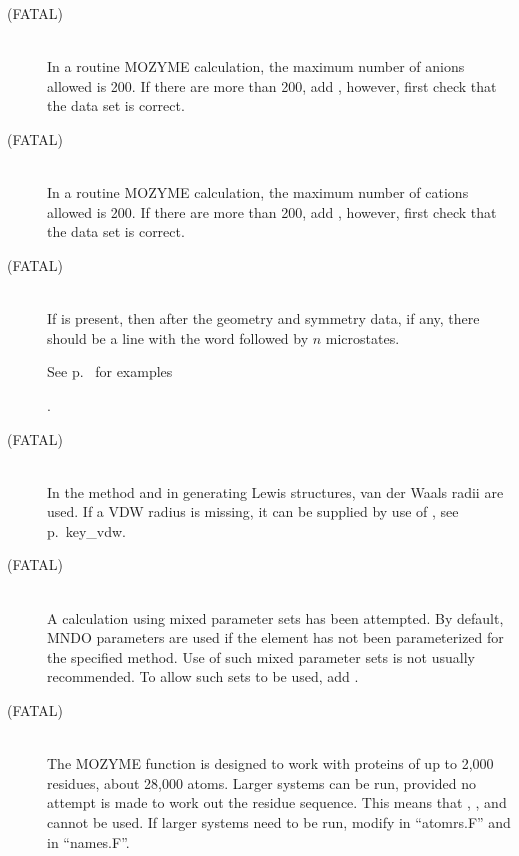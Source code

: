 \begin{description}
\item[ (FATAL)]~\\
In a routine MOZYME calculation, the maximum number of anions  allowed is 200.
If there are more than 200, add , however, first check that the data 
set is correct.

\item[ (FATAL)]~\\
In a routine MOZYME calculation, the maximum number of cations allowed is 200.
If there are more than 200, add , however, first check that the data set
is correct.

\item[ (FATAL)]~\\
If  is present, then after the geometry and symmetry
data, if any, there should be a line with the word
 followed by $n$ microstates.

\begin{latexonly}
See p.~\pageref{rs} for examples
\end{latexonly}.

\item[ (FATAL)]~\\
In the  method and in generating Lewis structures, van der Waals
radii are used.  If a VDW radius is missing, it can be  supplied by use of
\hyperref[pageref]{}{, see p.~}{}{key_vdw}.

\item[ (FATAL)]~\\
A calculation using mixed parameter sets has been attempted.  By default,
MNDO parameters are used if the element has not been parameterized for
the specified method.  Use of such mixed parameter sets is not usually
recommended.  To allow such sets to be used, add .

\item[ (FATAL)]~\\
The MOZYME function is designed to work with proteins of up to 2,000 residues,
about 28,000 atoms.  Larger systems can be run, provided no attempt is made
to work out the residue sequence.  This means that , , and
 cannot be used.  If larger systems need to be run, modify 
in ``atomrs.F'' and in ``names.F''.


\end{description}
